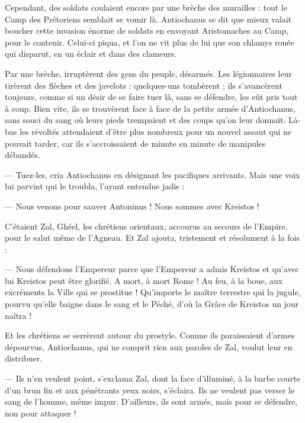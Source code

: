 \documentclass[a4paper, 11pt, oneside, polutonikogreek, french]{article}
\begin{document}
Cependant, des soldats coulaient encore par une brèche des murailles : tout le Camp des Prétoriens semblait se vomir là. Antiochanus se dit que mieux valait boucher cette invasion énorme de soldats en envoyant Aristomaches au Camp, pour le contenir. Celui-ci piqua, et l'on ne vit plus de lui que son chlamys rouée qui disparut, en un éclair et dans des clameurs.

Par une brèche, irruptèrent des gens du peuple, désarmés. Les légionnaires leur tirèrent des flèches et des javelots : quelques-uns tombèrent ; ils s'avancèrent toujours, comme si un désir de se faire tuer là, sans se défendre, les eût pris tout à coup. Bien vite, ils se trouvèrent face à face de la petite armée d'Antiochanus, sans souci du sang où leurs pieds trempaient et des coups qu'on leur donnait. Là-bas les révoltés attendaient d'être plus nombreux pour un nouvel assaut qui ne pouvait tarder, car ils s'accroissaient de minute en minute de manipules débandés.

--- Tuez-les, cria Antiochanus en désignant les pacifiques arrivants. Mais une voix lui parvint qui le troubla, l'ayant entendue jadis :

--- Nous venons pour sauver Antoninus ! Nous sommes avec Kreistos !

C'étaient Zal, Ghéel, les chrétiens orientaux, accourus au secours de l'Empire, pour le salut même de l'Agneau. Et Zal ajouta, tristement et résolument à la fois :

--- Nous défendons l'Empereur parce que l'Empereur a admis Kreistos et qu'avec lui Kreistos peut être glorifié. A mort, à mort Rome ! Au feu, à la boue, aux excréments la Ville qui se prostitue ! Qu'importe le maître terrestre qui la jugule, pourvu qu'elle baigne dans le sang et le Péché, d'où la Grâce de Kreistos un jour naîtra !

Et les chrétiens se serrèrent autour du prostyle. Comme ils paraissaient d'armes dépourvus, Antiochanus, qui ne comprit rien aux paroles de Zal, voulut leur en distribuer.

--- Ils n'en veulent point, s'exclama Zal, dont la face d'illuminé, à la barbe courte d'un brun fin et aux pénétrants yeux noirs, s'éclaira. Ils ne veulent pas verser le sang de l'homme, même impur. D'ailleurs, ils sont armés, mais pour se défendre, non pour attaquer !
\end{document}
